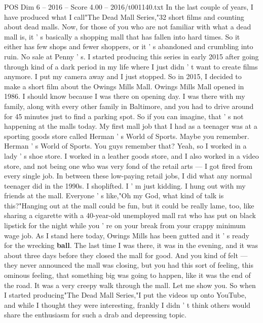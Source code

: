 \begin{textsample}{POS Dim 6 – 2016 – Score 4.00 – 2016/t001140.txt}  \label{ex:f6_pos_046}
In the last couple of years, I have produced what I call"The Dead Mall Series,"32 short films and counting about dead malls.
Now, for those of you who are not familiar with what a dead mall is, it ' s basically a shopping mall that has fallen into hard times.
So it either has few shops and fewer shoppers, or it ' s abandoned and crumbling into ruin.
No sale at Penny ' s.
I started producing this series in early 2015 after going through kind of a dark period in my life where I just didn ' t want to create films anymore.
I put my camera away and I just stopped.
So in 2015, I decided to make a short film about the Owings Mills Mall.
Owings Mills Mall opened in 1986.
I should know because I was there on opening day.
I was there with my family, along with every other family in Baltimore, and you had to drive around for 45 minutes just to find a parking spot.
So if you can imagine, that ' s not happening at the malls today.
My first mall job that I had as a teenager was at a sporting goods store called Herman ' s World of Sports.
Maybe you remember.
Herman ' s World of Sports.
You guys remember that?
Yeah, so I worked in a lady ' s shoe store.
I worked in a leather goods store, and I also worked in a video store, and not being one who was very fond of the retail arts — I got fired from every single job.
In between these low-paying retail jobs, I did what any normal teenager did in the 1990s.
I shoplifted.
I ' m just kidding.
I hung out with my friends at the mall.
Everyone ' s like,"Oh my God, what kind of talk is this?"Hanging out at the mall could be fun, but it could be really lame, too, like sharing a cigarette with a 40-year-old unemployed mall rat who has put on black lipstick for the night while you ' re on your break from your crappy minimum wage job.
As I stand here today, Owings Mills has been gutted and it ' s ready for the wrecking \textbf{ball}.
The last time I was there, it was in the evening, and it was about three days before they closed the mall for good.
And you kind of felt — they never announced the mall was closing, but you had this sort of feeling, this ominous feeling, that something big was going to happen, like it was the end of the road.
It was a very creepy walk through the mall.
Let me show you.
So when I started producing"The Dead Mall Series,"I put the videos up onto YouTube, and while I thought they were interesting, frankly I didn ' t think others would share the enthusiasm for such a drab and depressing topic.

\end{textsample}

